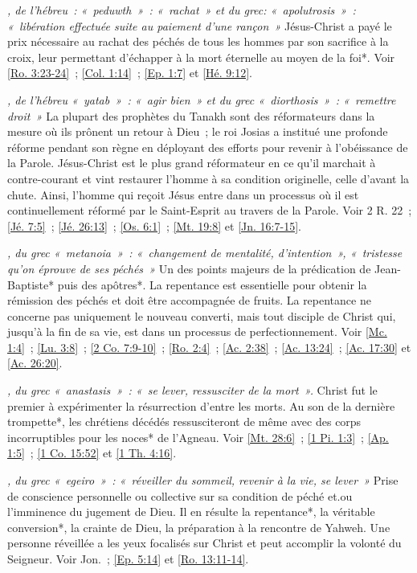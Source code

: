 \begin{multicols}{2}
\textit{, de l'hébreu~: «~peduwth~»~: «~rachat~» et du grec: «~apolutrosis~»~: «~libération effectuée suite au paiement d'une rançon~»}\newline
Jésus-Christ a payé le prix nécessaire au rachat des péchés de tous les hommes par son sacrifice à la croix, leur permettant d'échapper à la mort éternelle au moyen de la foi*. Voir \vref{Ro. 3:23-24}~; \vref{Col. 1:14}~; \vref{Ep. 1:7} et \vref{Hé. 9:12}.

\textit{, de l'hébreu «~yatab~»~: «~agir bien~» et du grec «~diorthosis~»~: «~remettre droit~»}\newline
La plupart des prophètes du Tanakh sont des réformateurs dans la mesure où ils prônent un retour à Dieu~; le roi Josias a institué une profonde réforme pendant son règne en déployant des efforts pour revenir à l'obéissance de la Parole. Jésus-Christ est le plus grand réformateur en ce qu'il marchait à contre-courant et vint restaurer l'homme à sa condition originelle, celle d'avant la chute. Ainsi, l'homme qui reçoit Jésus entre dans un processus où il est continuellement réformé par le Saint-Esprit au travers de la Parole. Voir 2 R. 22~; \vref{Jé. 7:5}~; \vref{Jé. 26:13}~; \vref{Os. 6:1}~; \vref{Mt. 19:8} et \vref{Jn. 16:7-15}.

\textit{, du grec «~metanoia~»~: «~changement de mentalité, d'intention~», «~tristesse qu'on éprouve de ses péchés~»}\newline
Un des points majeurs de la prédication de Jean-Baptiste* puis des apôtres*. La repentance est essentielle pour obtenir la rémission des péchés et doit être accompagnée de fruits. La repentance ne concerne pas uniquement le nouveau converti, mais tout disciple de Christ qui, jusqu'à la fin de sa vie, est dans un processus de perfectionnement. Voir \vref{Mc. 1:4}~; \vref{Lu. 3:8}~; \vref{2 Co. 7:9-10}~; \vref{Ro. 2:4}~; \vref{Ac. 2:38}~; \vref{Ac. 13:24}~; \vref{Ac. 17:30} et \vref{Ac. 26:20}.

\textit{, du grec «~anastasis~»~: «~se lever, ressusciter de la mort~».}\newline
Christ fut le premier à expérimenter la résurrection d'entre les morts. Au son de la dernière trompette*, les chrétiens décédés ressusciteront de même avec des corps incorruptibles pour les noces* de l'Agneau. Voir \vref{Mt. 28:6}~; \vref{1 Pi. 1:3}~; \vref{Ap. 1:5}~; \vref{1 Co. 15:52} et \vref{1 Th. 4:16}.

\textit{, du grec «~egeiro~»~: «~réveiller du sommeil, revenir à la vie, se lever~»}\newline
Prise de conscience personnelle ou collective sur sa condition de péché et.ou l'imminence du jugement de Dieu. Il en résulte la repentance*, la véritable conversion*, la crainte de Dieu, la préparation à la rencontre de Yahweh. Une personne réveillée a les yeux focalisés sur Christ et peut accomplir la volonté du Seigneur. Voir Jon.~; \vref{Ep. 5:14} et \vref{Ro. 13:11-14}.


\end{multicols}
